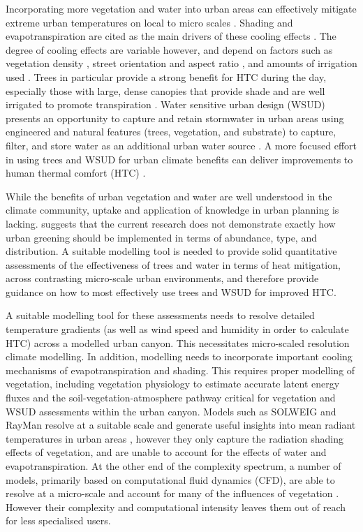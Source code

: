 \documentclass[final,3p,times,authoryear]{elsarticle}
\begin{document}
Incorporating more vegetation and water into urban areas can effectively mitigate extreme urban temperatures on local to micro scales \citep{Tsiros2010,Shashua-Bar2010a,Spangenberg2008,Coutts2012}. Shading and evapotranspiration are cited as the main drivers of these cooling effects \citep{Bowler2010}. The degree of cooling effects are variable however, and depend on factors such as vegetation density \citep{Hall2016,Bodnaruk2017}, street orientation and aspect ratio \citep{Thorsson2011,Ali-Toudert2006b}, and amounts of irrigation used \citep{Jenerette2011}. Trees in particular provide a strong benefit for HTC during the day, especially those with large, dense canopies that provide shade and are well irrigated to promote transpiration \citep{Coutts2015,Huang2008,Ylmaz2007,Shashua-Bar2000}. Water sensitive urban design (WSUD) presents an opportunity to capture and retain stormwater in urban areas using engineered and natural features (trees, vegetation, and substrate) to capture, filter, and store water as an additional urban water source \citep{Wong2009}. A more focused effort in using trees and WSUD for urban climate benefits can deliver improvements to human thermal comfort (HTC) \citep{Coutts2012}. 


While the benefits of urban vegetation and water are well understood in the climate community, uptake and application of knowledge in urban planning is lacking. \cite{Bowler2010} suggests that the current research does not demonstrate exactly how urban greening should be implemented in terms of abundance, type, and distribution.  A suitable modelling tool is needed to provide solid quantitative assessments of the effectiveness of trees and water in terms of heat mitigation, across contrasting micro-scale urban environments, and therefore provide guidance on how to most effectively use trees and WSUD for improved HTC. 

A suitable modelling tool for these assessments needs to resolve detailed temperature gradients (as well as wind speed and humidity in order to calculate HTC) across a modelled urban canyon. This necessitates micro-scaled resolution climate modelling. In addition, modelling needs to incorporate important cooling mechanisms of evapotranspiration and shading. This requires proper modelling of vegetation, including vegetation physiology to estimate accurate latent energy fluxes and the soil-vegetation-atmosphere pathway critical for vegetation and WSUD assessments within the urban canyon. Models such as SOLWEIG \citep{Lindberg2008a} and RayMan \citep{Matzarakis2007,Matzarakis2010} resolve at a suitable scale and generate useful insights into mean radiant temperatures in urban areas \citep{Chen2014a}, however they only capture the radiation shading effects of vegetation, and are unable to account for the effects of water and evapotranspiration. At the other end of the complexity spectrum, a number of models, primarily based on computational fluid dynamics (CFD), are able to resolve at a micro-scale and account for many of the influences of vegetation \citep{Bailey2014,Bailey2016,Kunz2000,Schlunzen2011a,Yamada2011,Bruse1999}. However their complexity and computational intensity leaves them out of reach for less specialised users.
\end{document}
